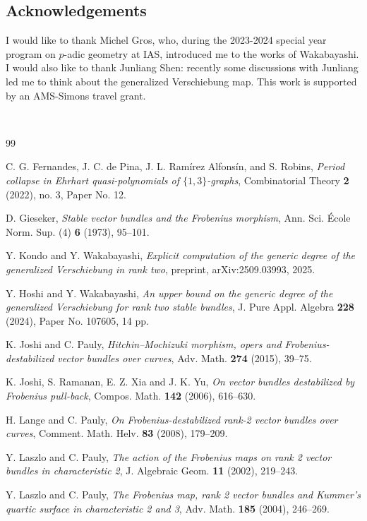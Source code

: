 \documentclass[11pt]{amsart}
\begin{document}
\subsection*{Acknowledgements}
I would like to thank Michel Gros, who,
during the 2023-2024 special year program on $p$-adic geometry at IAS, introduced me to the works of Wakabayashi.
I would also like to thank Junliang Shen: recently some  discussions with Junliang led me to think about the generalized Verschiebung map.
This work is supported by an AMS-Simons travel grant.

\;\\



\begin{thebibliography}{99}

C. G. Fernandes, J. C. de Pina, J. L. Ramírez Alfonsín, and S. Robins,
\emph{Period collapse in Ehrhart quasi-polynomials of \(\{1,3\}\)-graphs},
Combinatorial Theory \textbf{2} (2022), no. 3, Paper No. 12.

D. Gieseker,
\emph{Stable vector bundles and the Frobenius morphism},
Ann. Sci. \'Ecole Norm. Sup. (4) \textbf{6} (1973), 95--101.

Y. Kondo and Y. Wakabayashi,
\emph{Explicit computation of the generic degree of the generalized
Verschiebung in rank two},
preprint, arXiv:2509.03993, 2025.

Y. Hoshi and Y. Wakabayashi,
\emph{An upper bound on the generic degree of the generalized Verschiebung for
rank two stable bundles},
J. Pure Appl. Algebra \textbf{228} (2024), Paper No. 107605, 14 pp.

K. Joshi and C. Pauly,
\emph{Hitchin--Mochizuki morphism, opers and Frobenius-destabilized vector
bundles over curves},
Adv. Math. \textbf{274} (2015), 39--75.

K. Joshi, S. Ramanan, E. Z. Xia and J. K. Yu,
\emph{On vector bundles destabilized by Frobenius pull-back},
Compos. Math. \textbf{142} (2006), 616--630.

H. Lange and C. Pauly,
\emph{On Frobenius-destabilized rank-2 vector bundles over curves},
Comment. Math. Helv. \textbf{83} (2008), 179--209.

Y. Laszlo and C. Pauly,
\emph{The action of the Frobenius maps on rank 2 vector bundles in
characteristic 2},
J. Algebraic Geom. \textbf{11} (2002), 219--243.

Y. Laszlo and C. Pauly,
\emph{The Frobenius map, rank 2 vector bundles and Kummer's quartic surface in
characteristic 2 and 3},
Adv. Math. \textbf{185} (2004), 246--269.


\end{thebibliography}
\end{document}
